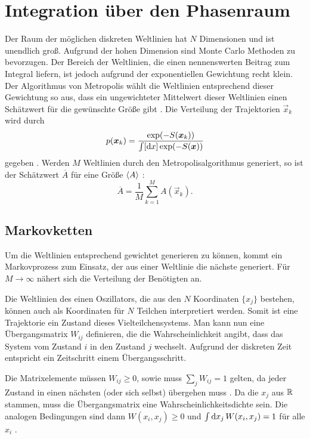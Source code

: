 \section{Integration über den Phasenraum}

Der Raum der möglichen diskreten Weltlinien hat $N$ Dimensionen und ist
unendlich groß. Aufgrund der hohen Dimension sind Monte Carlo Methoden zu
bevorzugen. Der Bereich der Weltlinien, die einen nennenswerten Beitrag zum
Integral liefern, ist jedoch aufgrund der exponentiellen Gewichtung recht
klein. Der Algorithmus von Metropolis wählt die Weltlinien entsprechend dieser
Gewichtung so aus, dass ein ungewichteter Mittelwert dieser Weltlinien einen
Schätzwert für die gewünschte Größe gibt
\parencite[434]{Creutz/Statistical_Approach_QM}. Die Verteilung der
Trajektorien $\vec x_k$ wird durch
\begin{equation}
    \label{eq:p_x_k}
    p(\vec x_k) = \frac{\exp(-S(\vec x_k))}{\int [\dif x] \exp(-S(\vec x))}
\end{equation}
gegeben \parencite[(3.6)]{Creutz/Statistical_Approach_QM}. Werden $M$
Weltlinien durch den Metropolisalgorithmus generiert, so ist der Schätzwert
$\overline A$ für
eine Größe $\langle A \rangle$
\parencite[(3.7)]{Creutz/Statistical_Approach_QM}:
\[
    \overline A = \frac1M \sum_{k=1}^M A(\vec x_k).
\]

\subsection{Markovketten}

Um die Weltlinien entsprechend gewichtet generieren zu können, kommt ein
Markovprozess zum Einsatz, der aus einer Weltlinie die nächste generiert. Für
$M \to \infty$ nähert sich die Verteilung der Benötigten an.
\parencite[434]{Creutz/Statistical_Approach_QM}


Die Weltlinien des einen Oszillators, die aus den $N$ Koordinaten $\{x_j\}$
bestehen, können auch als Koordinaten für $N$ Teilchen interpretiert werden.
Somit ist eine Trajektorie ein Zustand dieses Vielteilchensystems. Man kann nun
eine Übergangsmatrix $W_{ij}$ definieren, die die Wahrscheinlichkeit angibt,
dass das System vom Zustand $i$ in den Zustand $j$ wechselt. Aufgrund der
diskreten Zeit entspricht ein Zeitschritt einem Übergangsschritt.

Die Matrixelemente müssen $W_{ij} \geq 0$, sowie muss $\sum_j W_{ij} = 1$
gelten, da jeder Zustand in einen nächsten (oder sich selbst) übergehen muss
\parencite[(3.8)]{Creutz/Statistical_Approach_QM}. Da die $x_j$ aus $\mathbb R$
stammen, muss die Übergangsmatrix eine Wahrscheinlichkeitsdichte sein. Die
analogen Bedingungen sind dann $W(x_i, x_j) \geq 0$ und $\int \dif x_j \,
W(x_i, x_j) = 1$ für alle $x_i$
\parencite[(3.9)]{Creutz/Statistical_Approach_QM}.

